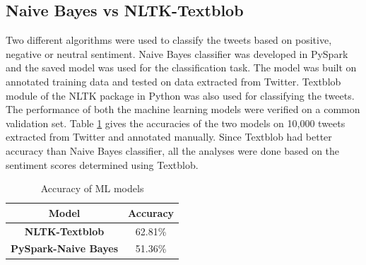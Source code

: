 \documentclass[9pt,twocolumn,twoside]{../../styles/osajnl}
\begin{document}
\subsection{Naive Bayes vs NLTK-Textblob}
Two different algorithms were used to classify the tweets based on positive, negative or neutral sentiment. Naive Bayes classifier was developed in PySpark and the saved model was used for the classification task. The model was built on annotated training data and tested on data extracted from Twitter. Textblob module of the NLTK package in Python was also used for classifying the tweets. The performance of both the machine learning models were verified on a common validation set. Table \ref{tab-acc} gives the accuracies of the two models on 10,000 tweets extracted from Twitter and annotated manually. Since Textblob had better accuracy than Naive Bayes classifier, all the analyses were done based on the sentiment scores determined using Textblob. 
\begin{table}[htb]
\centering
\caption{Accuracy of ML models}
\label{tab-acc}
\begin{tabular}{@{}cc@{}}
\toprule
\textbf{Model}               & \textbf{Accuracy} \\ \midrule
\textbf{NLTK-Textblob}       & 62.81\%           \\
\textbf{PySpark-Naive Bayes} & 51.36\%           \\ \bottomrule
\end{tabular}
\end{table}
\end{document}
